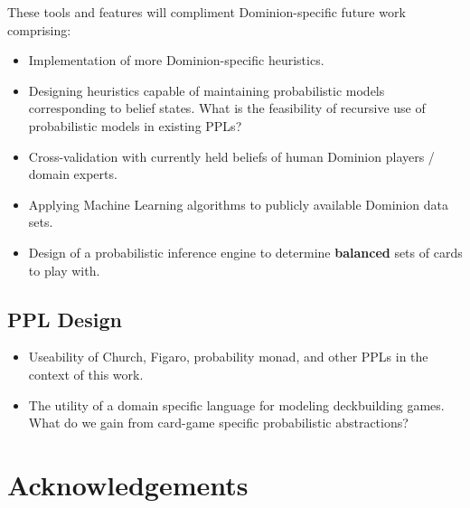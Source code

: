 These tools and features will compliment Dominion-specific future
work comprising:

\begin{itemize}
\item Implementation of more Dominion-specific heuristics.
\item Designing heuristics capable of maintaining probabilistic models
      corresponding to belief states. What is the feasibility of recursive
      use of probabilistic models in existing PPLs?
\item Cross-validation with currently held beliefs of human Dominion
      players / domain experts. \cite{human-card-comparisons}
\item Applying Machine Learning algorithms to publicly available Dominion
      data sets. \cite{dominion-data-sets}
\item Design of a probabilistic inference engine to determine
      {\bf balanced} sets of cards to play with.
\end{itemize}

\subsection{PPL Design} \label{sec:future:PPL}

\begin{itemize}
\item Useability of Church, Figaro, probability monad, and other
      PPLs in the context of this work.
\item The utility of a domain specific language for modeling deckbuilding
      games. What do we gain from card-game specific probabilistic
      abstractions?
\end{itemize}


\section{Acknowledgements} \label{sec:ack}

